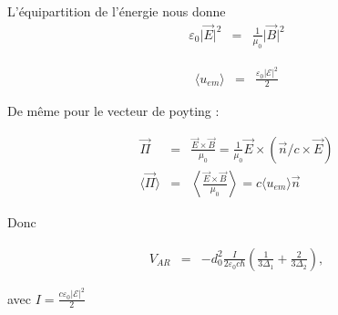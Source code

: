 L'équipartition de l'énergie nous donne 
\begin{eqnarray}
	\varepsilon_0 	\vert \vec{E}\vert^2 & = & \frac{1}{\mu_0} \vert\vec{B}\vert^2 
\end{eqnarray}

\begin{eqnarray}
	\langle u_{em} \rangle & = & \frac{\varepsilon_0 \vert \mathcal{E} \vert ^2 }{2} 
\end{eqnarray}

De même pour le vecteur de poyting :

\begin{eqnarray}
	\vec{\Pi} & = &  \frac{ \vec{E} \times \vec{B}} { \mu_0} = \frac{1}{\mu_0 } \vec{E} \times ( \vec{n}/c \times \vec{E} ) \\
	\langle \vec{\Pi} \rangle & = & \left \langle \frac{ \vec{E} \times \vec{B}} { \mu_0} \right \rangle =  c \langle u_{em} \rangle \vec{n} 	
\end{eqnarray}

Donc 

\begin{eqnarray*}
	V_{AR} &  = &  - d_0^2 \frac{   I }{2 \varepsilon_0 c  \hbar} \left( \frac{ 1}{ 3 \Delta_1} + \frac{2 }{ 3 \Delta_2}  \right ) ,		
\end{eqnarray*}

avec $I = \frac{c \varepsilon_0 \vert \mathcal{E} \vert^2}{2}$